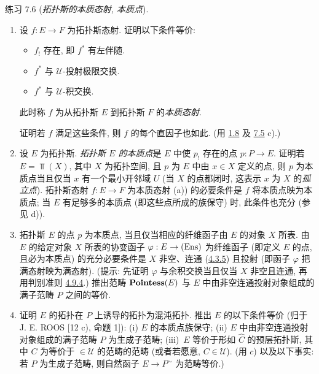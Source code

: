 \begin{enonce*}[remark]{练习 7.6}
(\emph{拓扑斯的本质态射, 本质点}).
\begin{enumerate}
\renewcommand{\theenumi}{\alph{enumi}}
\renewcommand{\labelenumi}{\theenumi)}
\item 设 $f:E\rightarrow F$ 为拓扑斯态射. 证明以下条件等价:
\begin{itemize}
\item[i)] $f_{!}$ 存在, 即 $f^{\ast}$ 有左伴随.

\item[ii)] $f^{\ast}$ 与 $𝒰$-投射极限交换.

\item[${\rm ii')}$] $f^{\ast}$ 与 $𝒰$-积交换.
\end{itemize}
此时称 $f$ 为从拓扑斯 $E$ 到拓扑斯 $F$ 的\emph{本质态射}.

证明若 $f$ 满足这些条件, 则 $f$ 的每个直因子也如此. (用 \hyperref[IV.rem1.8]{1.8} 及 \hyperref[IV.exer7.5]{7.5} c).)

\item 设 $E$ 为拓扑斯. \emph{拓扑斯 $E$ 的本质点}是 $E$ 中使 $p_{!}$ 存在的点 $p:P\rightarrow E$. 证明若 $E=\Top(X)$, 其中 $X$ 为拓扑空间, 且 $p$ 为 $E$ 中由 $x\in X$ 定义的点, 则 $p$ 为本质点\pageoriginale 当且仅当 $x$ 有一个最小开邻域 $U$ (当 $X$ 的点都闭时, 这表示 $x$ 为 $X$ 的\emph{孤立点}). 拓扑斯态射 $f:E\rightarrow F$ 为本质态射 (a)) 的必要条件是 $f$ 将本质点映为本质点; 当 $E$ 有足够多的本质点 (即这些点所成的族保守) 时, 此条件也充分 (参见 d)).

\item 拓扑斯 $E$ 的点 $p$ 为本质点, 当且仅当相应的纤维函子由 $E$ 的对象 $X$ 所表. 由 $E$ 的给定对象 $X$ 所表的协变函子 $\varphi:E\rightarrow (\operatorname{Ens})$ 为纤维函子 (即定义 $E$ 的点, 且必为本质点) 的充分必要条件是 $X$ 非空、连通 (\hyperref[IV.subsubsec4.3.5]{4.3.5}) 且投射 (即函子 $\varphi$ 把满态射映为满态射). (提示: 先证明 $\varphi$ 与余积交换当且仅当 $X$ 非空且连通, 再用判别准则 \hyperref[IV.prop4.9.4]{4.9.4}.) 推出范畴 $\operatorname{\mathbf{Pointess}}(E)$ 与 $E$ 中由非空连通投射对象组成的满子范畴 $P$ 之间的等价.

\item 证明 $E$ 的拓扑在 $P$ 上诱导的拓扑为混沌拓扑. 推出 $E$ 的以下条件等价 (归于 J. E. ROOS [12 c), 命题 1]): (i) $E$ 的本质点族保守; (ii) $E$ 中由非空连通投射对象组成的满子范畴 $P$ 为生成子范畴; (iii)~$E$ 等价于形如 $\widehat{C}$ 的预层拓扑斯, 其中 $C$ 为等价于 $\in 𝒰$ 的范畴的范畴 (或者若愿意, $C\in 𝒰$). (用 $c$) 以及以下事实: 若 $P$ 为生成子范畴, 则自然函子 $E\rightarrow P^{\sim}$ 为范畴\pageoriginale 等价.)


\end{enumerate}
\end{enonce*}
